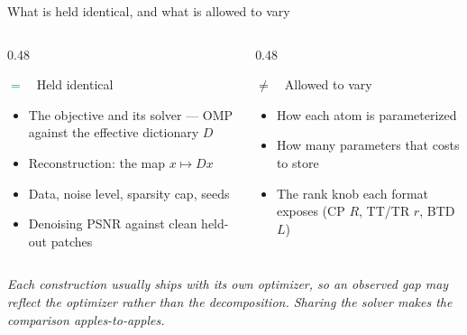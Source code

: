 \documentclass[aspectratio=169,9pt]{beamer}
\newcommand{\takeaway}[1]{\begin{center}\textit{\small #1}\end{center}}
\begin{document}
\begin{frame}{What is held identical, and what is allowed to vary}
\begin{columns}[T,onlytextwidth]
\begin{column}{0.48\textwidth}
\begin{block}{\textcolor{teal}{$=$}\ \ Held identical}
\small
\begin{itemize}
  \item The objective and its solver --- OMP against the effective dictionary $D$
  \item Reconstruction: the map $x \mapsto Dx$
  \item Data, noise level, sparsity cap, seeds
  \item Denoising PSNR against clean held-out patches
\end{itemize}
\end{block}
\end{column}
\begin{column}{0.48\textwidth}
\begin{block}{\textcolor{amber}{$\neq$}\ \ Allowed to vary}
\small
\begin{itemize}
  \item How each atom is parameterized
  \item How many parameters that costs to store
  \item The rank knob each format exposes (CP $R$, TT/TR $r$, BTD $L$)
\end{itemize}
\end{block}
\end{column}
\end{columns}
\takeaway{Each construction usually ships with its own optimizer, so an observed
gap may reflect the optimizer rather than the decomposition. Sharing the solver
makes the comparison apples-to-apples.}
\end{frame}
\end{document}

